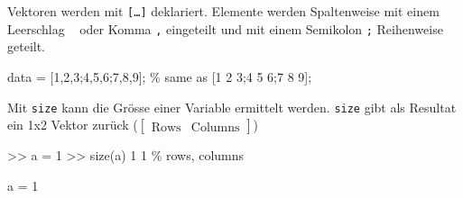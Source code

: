 \documentclass[
  10pt,
  a4paper,
]{article}
\newenvironment{Shaded}{}{}
\newcommand{\CommentTok}[1]{\textcolor[rgb]{0.42,0.45,0.49}{#1}}
\newcommand{\FloatTok}[1]{\textcolor[rgb]{0.00,0.36,0.77}{#1}}
\newcommand{\NormalTok}[1]{\textcolor[rgb]{0.14,0.16,0.18}{#1}}
\newcommand{\OperatorTok}[1]{\textcolor[rgb]{0.14,0.16,0.18}{#1}}
\newcommand{\VariableTok}[1]{\textcolor[rgb]{0.89,0.38,0.04}{#1}}
\numberwithin{equation}{section}
\begin{document}
\begin{multicols}{2}
Vektoren werden mit \texttt{{[}…{]}} deklariert. Elemente werden
Spaltenweise mit einem Leerschlag
\texttt{\textquotesingle{}\ \textquotesingle{}} oder Komma \texttt{,}
eingeteilt und mit einem Semikolon \texttt{;} Reihenweise geteilt.

\begin{Shaded}
\begin{Highlighting}[]
\VariableTok{data} \OperatorTok{=}\NormalTok{ [}\FloatTok{1}\OperatorTok{,}\FloatTok{2}\OperatorTok{,}\FloatTok{3}\OperatorTok{;}\FloatTok{4}\OperatorTok{,}\FloatTok{5}\OperatorTok{,}\FloatTok{6}\OperatorTok{;}\FloatTok{7}\OperatorTok{,}\FloatTok{8}\OperatorTok{,}\FloatTok{9}\NormalTok{]}\OperatorTok{;} \CommentTok{\% same as [1 2 3;4 5 6;7 8 9];}
\end{Highlighting}
\end{Shaded}

\begin{tcolorbox}[enhanced jigsaw, coltitle=black, arc=.35mm, breakable, opacityback=0, opacitybacktitle=0.6, rightrule=.15mm, titlerule=0mm, bottomrule=.15mm, leftrule=.75mm, bottomtitle=1mm, colframe=quarto-callout-note-color-frame, toprule=.15mm, colbacktitle=quarto-callout-note-color!10!white, toptitle=1mm, title=\textcolor{quarto-callout-note-color}{\faInfo}\hspace{0.5em}{Grösse \texttt{size}}, left=2mm, colback=white]

Mit \texttt{size} kann die Grösse einer Variable ermittelt werden.
\texttt{size} gibt als Resultat ein 1x2 Vektor zurück
(\(\begin{bmatrix}\text{Rows} & \text{Columns}\end{bmatrix}\))

\begin{Shaded}
\begin{Highlighting}[]
\OperatorTok{\textgreater{}\textgreater{}} \VariableTok{a} \OperatorTok{=} \FloatTok{1}
\OperatorTok{\textgreater{}\textgreater{}} \VariableTok{size}\NormalTok{(}\VariableTok{a}\NormalTok{)}
     \FloatTok{1}     \FloatTok{1}  \CommentTok{\% rows, columns}
\end{Highlighting}
\end{Shaded}

\end{tcolorbox}

\begin{Shaded}
\begin{Highlighting}[]
\VariableTok{a} \OperatorTok{=} \FloatTok{1}
\end{Highlighting}
\end{Shaded}


\end{multicols}
\end{document}
